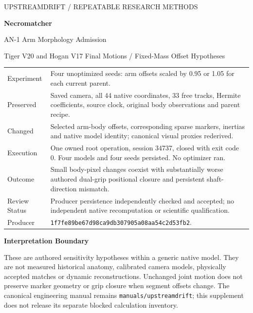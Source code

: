 \documentclass[11pt,letterpaper]{article}
\newcommand{\code}[1]{\nolinkurl{#1}}\newcommand{\hash}[1]{{\footnotesize\nolinkurl{#1}}}
\begin{document}
\hypersetup{pageanchor=false}
\begin{titlepage}\thispagestyle{empty}\vspace*{0.5in}
{\large\textcolor{accent}{UPSTREAMDRIFT / REPEATABLE RESEARCH METHODS}}\par\vspace{.25in}
{\Huge\bfseries\textcolor{ink}{Necromatcher}}\par\vspace{.18in}
{\LARGE AN-1 Arm Morphology Admission}\par\vspace{.28in}
{\large Tiger V20 and Hogan V17 Final Motions / Fixed-Mass Offset Hypotheses}\par\vspace{.3in}
\begin{tabular}{@{}p{1.3in}p{4.65in}@{}}\toprule
Experiment & Four unoptimized seeds: arm offsets scaled by 0.95 or 1.05 for each current parent.\\
Preserved & Saved camera, all 44 native coordinates, 33 free tracks, Hermite coefficients, source clock, original body observations and parent recipe.\\
Changed & Selected arm-body offsets, corresponding sparse markers, inertias and native model identity; canonical visual proxies rederived.\\
Execution & One owned root operation, session 34737, closed with exit code 0. Four models and four seeds persisted. No optimizer ran.\\
Outcome & Small body-pixel changes coexist with substantially worse authored dual-grip positional closure and persistent shaft-direction mismatch.\\
Review Status & Producer persistence independently checked and accepted; no independent native recomputation or scientific qualification.\\
Producer & \hash{1f7fe89be67d98ca9db307905a08aa54c2d53fb2}.\\\bottomrule
\end{tabular}
\vfill\textcolor{ink}{\textbf{Interpretation Boundary}}\par
These are authored sensitivity hypotheses within a generic native model. They are not measured historical anatomy, calibrated camera models, physically accepted matches or dynamic reconstructions. Unchanged joint motion does not preserve marker geometry or grip closure when segment offsets change. The canonical engineering manual remains \code{manuals/upstreamdrift}; this supplement does not release its separate blocked calculation inventory.
\end{titlepage}\hypersetup{pageanchor=true}
\end{document}

